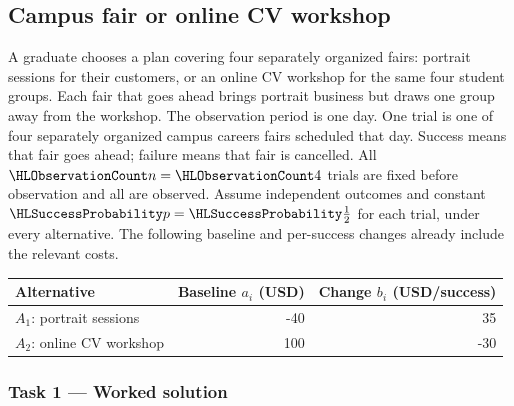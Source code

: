 \subsection{Campus fair or online CV workshop}\label{prob:c4-coffee}
A graduate chooses a plan covering four separately organized fairs: portrait sessions for their customers, or an online CV workshop for the same four student groups. Each fair that goes ahead brings portrait business but draws one group away from the workshop.
The observation period is one day. One trial is one of four separately organized campus careers fairs scheduled that day.
Success means that fair goes ahead; failure means that fair is cancelled.
All $\TrialCount{n}=\TrialCount{4}$ trials are fixed before observation and all are observed. 
Assume independent outcomes and constant $\SuccessProb{p}=\SuccessProb{\frac{1}{2}}$ for each trial, under every alternative. 
The following baseline and per-success changes already include the relevant costs.
\begin{center}\begin{tabular}{lrr}\toprule Alternative & Baseline $a_i$ (USD) & Change $b_i$ (USD/success)\\\midrule
$A_1$: portrait sessions & -40 & 35\\
$A_2$: online CV workshop & 100 & -30\\
\bottomrule\end{tabular}\end{center}
\subsubsection*{Task 1 --- Worked solution}\label{sol:c4-coffee-model}
